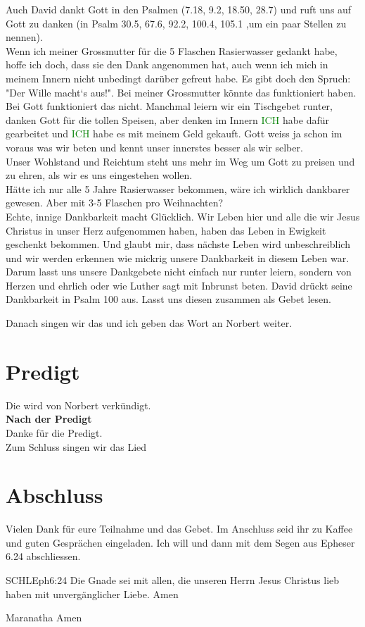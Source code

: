 \begin{spacing}{1.5}
Auch David dankt Gott in den Psalmen (7.18, 9.2, 18.50, 28.7) und ruft uns auf Gott zu danken (in Psalm 30.5, 67.6, 92.2, 100.4, 105.1 ,um ein paar Stellen zu nennen).\\
Wenn ich meiner Grossmutter für die 5 Flaschen Rasierwasser gedankt habe, hoffe ich doch, dass sie den Dank angenommen hat, auch wenn ich mich in meinem Innern nicht unbedingt darüber gefreut habe. Es gibt doch den Spruch: "Der Wille macht`s aus!". Bei meiner Grossmutter könnte das funktioniert haben. Bei Gott funktioniert das nicht. Manchmal leiern wir ein Tischgebet runter, danken Gott für die tollen Speisen, aber denken im Innern \textcolor{green}{ICH} habe dafür gearbeitet und \textcolor{green}{ICH} habe es mit meinem Geld gekauft. Gott weiss ja schon im voraus was wir beten und kennt unser innerstes besser als wir selber.\\ Unser Wohlstand und Reichtum steht uns mehr im Weg um Gott zu preisen und zu ehren, als wir es uns eingestehen wollen.\\ Hätte ich nur alle 5 Jahre Rasierwasser bekommen, wäre ich wirklich dankbarer gewesen. Aber mit 3-5  Flaschen pro Weihnachten?\\ Echte, innige Dankbarkeit macht Glücklich. Wir Leben hier und alle die wir Jesus Christus in unser Herz aufgenommen haben, haben das Leben in Ewigkeit geschenkt bekommen. Und glaubt mir, dass nächste Leben wird unbeschreiblich und wir werden erkennen wie mickrig unsere Dankbarkeit in diesem Leben war. Darum lasst uns unsere Dankgebete nicht einfach nur runter leiern, sondern von Herzen und ehrlich oder wie Luther sagt mit Inbrunst beten. David drückt seine Dankbarkeit in Psalm 100 aus. Lasst uns diesen zusammen als Gebet lesen.

Danach singen wir das  und ich geben das Wort an Norbert weiter.

\end{spacing}

\section{Predigt}
Die wird von Norbert verkündigt.\\

\textbf{Nach der Predigt}\\

Danke für die Predigt.\\

Zum Schluss singen wir das Lied 

\section{Abschluss}
Vielen Dank für eure Teilnahme und das Gebet. Im Anschluss seid ihr zu Kaffee und guten Gesprächen eingeladen.
Ich will \beten{} und dann mit dem Segen aus Epheser 6.24 abschliessen.
\begin{bibelbox}{SCHL}{Eph}{6:24}
Die Gnade sei mit allen, die unseren Herrn Jesus Christus lieb haben mit unvergänglicher Liebe. Amen
\end{bibelbox}
Maranatha Amen
